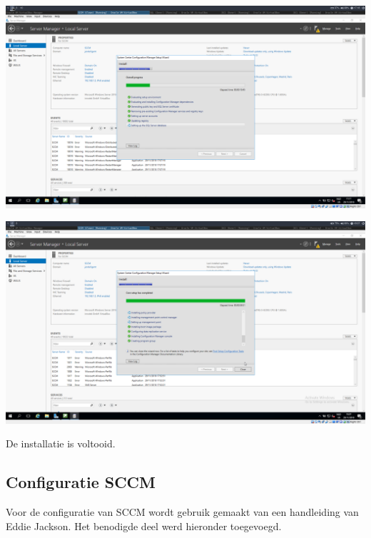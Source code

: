 \documentclass[a4paper]{article}
\begin{document}
\begin{center}
\includegraphics[width=15cm]{Pictures/SCCM/6/1543508319.png}


\end{center}
\begin{center}
\includegraphics[width=15cm]{Pictures/SCCM/6/1543511255.png}

De installatie is voltooid.
\end{center}

\clearpage

\subsection{Configuratie SCCM}

Voor de configuratie van SCCM wordt gebruik gemaakt van een handleiding van Eddie Jackson. Het 
benodigde deel werd hieronder toegevoegd.


\end{document}
